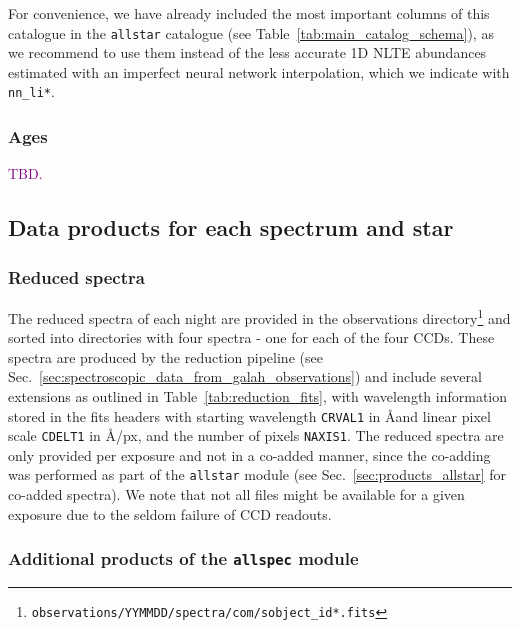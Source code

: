\documentclass[
  journal=pasa,
  manuscript=research-paper, %
  year=2024,
  volume=37
]{cup-journal}
\newcommand{\SB}[1]{{\textcolor{purple}{#1}}}
\begin{document}
For convenience, we have already included the most important columns of this catalogue in the \texttt{allstar} catalogue (see Table~\ref{tab:main_catalog_schema}), as we recommend to use them instead of the less accurate 1D NLTE abundances estimated with an imperfect neural network interpolation, which we indicate with \texttt{nn\_li*}.

\subsubsection{Ages}

\SB{TBD.}

\subsection{Data products for each spectrum and star}
\label{sec:data_products_for_each_spectrum}

\subsubsection{Reduced spectra} \label{sec:reduced_spectra}

The reduced spectra of each night are provided in the observations directory\footnote{\texttt{observations/YYMMDD/spectra/com/sobject\_id*.fits}} and sorted into directories with four spectra - one for each of the four CCDs. These spectra are produced by the reduction pipeline (see Sec.~\ref{sec:spectroscopic_data_from_galah_observations}) and include several extensions as outlined in Table~\ref{tab:reduction_fits}, with wavelength information stored in the fits headers with starting wavelength \texttt{CRVAL1} in \AA and linear pixel scale \texttt{CDELT1} in \AA/px, and the number of pixels \texttt{NAXIS1}. The reduced spectra are only provided per exposure and not in a co-added manner, since the co-adding was performed as part of the \texttt{allstar} module (see Sec.~\ref{sec:products_allstar} for co-added spectra). We note that not all files might be available for a given exposure due to the seldom failure of CCD readouts.

\subsubsection{Additional products of the \texttt{allspec} module} \label{sec:products_allspec}
\end{document}
